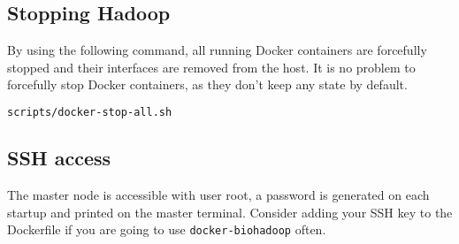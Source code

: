 \subsection{Stopping Hadoop}
By using the following command, all running Docker containers are forcefully stopped and their interfaces are removed from the host. It is no problem to forcefully stop Docker containers, as they don't keep any state by default.
\begin{lstlisting}[language=bash]
scripts/docker-stop-all.sh
\end{lstlisting}

\subsection{SSH access}
The master node is accessible with user root, a password is generated on each startup and printed on the master terminal. Consider adding your SSH key to the Dockerfile if you are going to use \texttt{docker-biohadoop} often.

